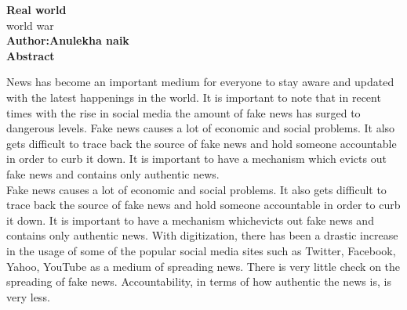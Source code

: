 \documentclass[10pt,a4paper]{article}
\begin{document}
\thispagestyle{plain}
\begin{center}
\Large
\textbf{Real world}\\
\large
\vspace{0.4cm}
world war\\
\vspace{0.4cm}
\textbf{Author:Anulekha naik}\\
\vspace{0.9cm}
\textbf{Abstract}\\
\end{center}

News has become an important medium for everyone to stay aware and updated
with the latest happenings in the world. It is important to note that in recent times
with the rise in social media the amount of fake news has surged to dangerous
levels. Fake news causes a lot of economic and social problems. It also gets
difficult to trace back the source of fake news and hold someone accountable in
order to curb it down. It is important to have a mechanism which evicts out fake
news and contains only authentic news.\\
  Fake news causes a lot of economic and social problems. It also gets difficult to
trace back the source of fake news and hold someone accountable in order to curb
it down. It is important to have a mechanism whichevicts out fake news and
contains only authentic news. With digitization, there has been a drastic increase in
the usage of some of the popular social media sites such as Twitter, Facebook,
Yahoo, YouTube as a medium of spreading news. There is very little check on the
spreading of fake news. Accountability, in terms of how authentic the news is, is
very less.
\end{document}
